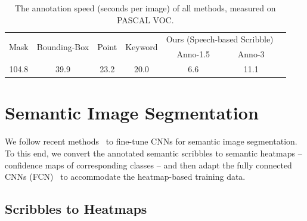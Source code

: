 \documentclass[runningheads]{llncs}
\begin{document}
\begin{table}[tb]
   \centering \small
\setlength\tabcolsep{1.5mm} {
  \begin{tabular}{|c|c|c|c||c|c|c|}  \hline
       \multirow{2}{*}{Mask} & \multirow{2}{*}{Bounding-Box} & \multirow{2}{*}{Point}  & \multirow{2}{*}{Keyword} & \multicolumn{2}{c|}{Ours (Speech-based Scribble)}  \\ \cline{5-6}
         & & & & Anno-1.5 & Anno-3  \\ \hline
        104.8  & 39.9 &  23.2 & 20.0  &  6.6     & 11.1\\  \hline
       \end{tabular} }
       \caption{The annotation speed (seconds per image) of all methods, measured on PASCAL VOC.}
       \label{table:speed}  \vspace{-6mm}
\end{table}




\section{Semantic Image Segmentation}
\label{sec:method}



We follow recent methods~\citep{rcnn, Long_2015_CVPR, crfasrnn} to
fine-tune CNNs for semantic image segmentation. To this end, we
convert the annotated semantic scribbles to semantic heatmaps --
confidence maps of corresponding classes -- and then adapt the fully
connected CNNs (FCN)~\citep{Long_2015_CVPR} to accommodate the
heatmap-based training data.

\subsection{Scribbles to Heatmaps} 
\label{sec:scribble}
\end{document}
